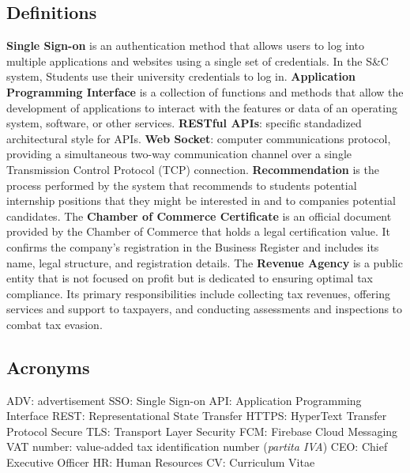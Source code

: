 \subsection{Definitions}
\textbf{Single Sign-on} is an authentication method that allows users to log into multiple applications and websites using a single set of credentials. In the S\&C system, Students use their university credentials to log in.\newline
\textbf{Application Programming Interface} is a collection of functions and methods that allow the development of applications to interact with the features or data of an operating system, software, or other services.\newline
\textbf{RESTful APIs}: specific standadized architectural style for APIs.
\textbf{Web Socket}: computer communications protocol, providing a simultaneous two-way communication channel over a single Transmission Control Protocol (TCP) connection.
\textbf{Recommendation} is the process performed by the system that recommends to students potential internship positions that they might be interested in and to companies potential candidates.\newline
The \textbf{Chamber of Commerce Certificate} is an official document provided by the Chamber of Commerce that holds a legal certification value. It confirms the company's registration in the Business Register and includes its name, legal structure, and registration details.\newline
The \textbf{Revenue Agency} is a public entity that is not focused on profit but is dedicated to ensuring optimal tax compliance. Its primary responsibilities include collecting tax revenues, offering services and support to taxpayers, and conducting assessments and inspections to combat tax evasion.
\subsection{Acronyms}
ADV: advertisement\newline
SSO: Single Sign-on \newline
API: Application Programming Interface\newline
REST: Representational State Transfer\newline
HTTPS: HyperText Transfer Protocol Secure\newline
TLS: Transport Layer Security \newline
FCM: Firebase Cloud Messaging \newline
VAT number: value-added tax identification number (\textit {partita IVA})\newline
CEO: Chief Executive Officer \newline
HR: Human Resources\newline
CV: Curriculum Vitae
